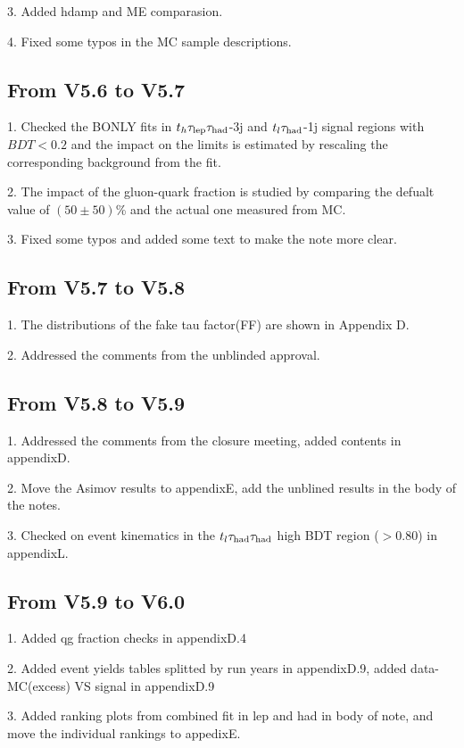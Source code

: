 3. Added hdamp and ME comparasion.

4. Fixed some typos in the MC sample descriptions.

\subsection{From V5.6 to V5.7}

1. Checked the BONLY fits in $t_h\tau_\text{lep}{}\tau_\text{had}$-3j and $t_l\tau_\text{had}$-1j signal regions with $BDT<0.2$ and the impact on the limits is estimated by
rescaling the corresponding background from the fit.

2. The impact of the gluon-quark fraction is studied by comparing the defualt value of $(50\pm50)$\% and the actual one measured from MC.

3. Fixed some typos and added some text to make the note more clear. 

\subsection{From V5.7 to V5.8}

1. The distributions of the fake tau factor(FF) are shown in Appendix D.

2. Addressed the comments from the unblinded approval. 

\subsection{From V5.8 to V5.9}

1. Addressed the comments from the closure meeting, added contents in appendixD.

2. Move the Asimov results to appendixE, add the unblined results in the body of the notes.

3. Checked on event kinematics in the $t_l\tau_\text{had}{}\tau_\text{had}$ high BDT region ($>0.80$) in appendixL.

\subsection{From V5.9 to V6.0}

1. Added qg fraction checks in appendixD.4

2. Added event yields tables splitted by run years in appendixD.9, added data-MC(excess) VS signal in appendixD.9

3. Added ranking plots from combined fit in lep and had in body of note, and move the individual rankings to appedixE.

